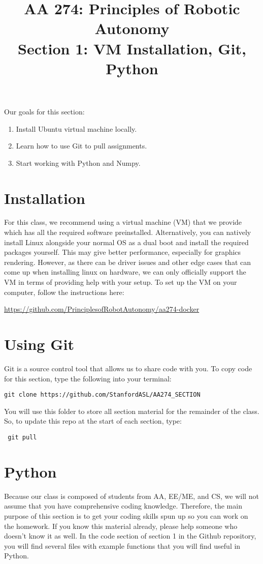 \documentclass{article}
\title{AA 274: Principles of Robotic Autonomy \\ Section 1: VM Installation, Git, Python}
\date{}
\begin{document}
\maketitle
\pagestyle{fancy}

Our goals for this section: \begin{enumerate}
	\item Install Ubuntu virtual machine locally.
	\item Learn how to use Git to pull assignments.
	\item Start working with Python and Numpy.
\end{enumerate}


\section{Installation}
For this class, we recommend using a virtual machine (VM) that we provide which has all the
required software preinstalled.
Alternatively, you can natively install Linux alongside your normal OS as a dual boot and install the required
packages yourself. This may give better performance, especially for graphics rendering. However, as there
can be driver issues and other edge cases that can come up when installing linux on hardware, we can only
officially support the VM in terms of providing help with your setup.
To set up the VM on your computer, follow the instructions here: 

\href{https://github.com/PrinciplesofRobotAutonomy/aa274-docker}{https://github.com/PrinciplesofRobotAutonomy/aa274-docker}

\section{Using Git}
Git is a source control tool that allows us to share code with you. To copy code for this section, type the following into your terminal:

 \begin{lstlisting}[escapechar=|]
 git clone https://github.com/StanfordASL/AA274_SECTION
\end{lstlisting}

You will use this folder to store all section material for the remainder of the class. So, to update this repo at the start of each section, type: 

 \begin{lstlisting}
 git pull
\end{lstlisting}

\section{Python}
Because our class is composed of students from AA, EE/ME, and CS, we will not assume that you have comprehensive coding knowledge. Therefore, the main purpose of this section is to get your coding skills spun up so you can work on the homework. If you know this material already, please help someone who doesn't know it as well. In the code section of section 1 in the Github repository, you will find several files with example functions that you will find useful in Python. 
\end{document}
